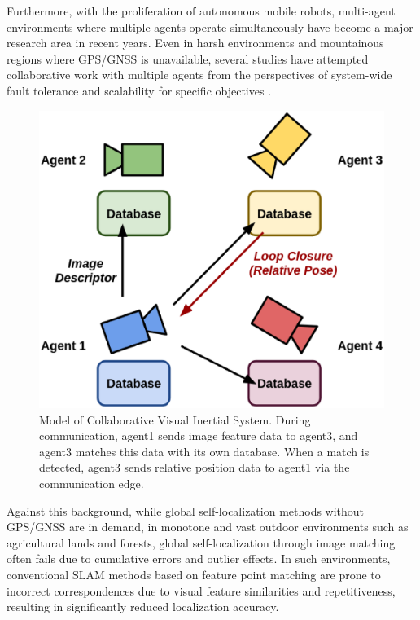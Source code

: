 \documentclass[a4paper,fleqn,10pt,twocolumn]{SICE_ISCS}
\begin{document}
Furthermore, with the proliferation of autonomous mobile robots, multi-agent environments where multiple agents operate simultaneously have become a major research area in recent years. Even in harsh environments and mountainous regions where GPS/GNSS is unavailable, several studies have attempted collaborative work with multiple agents from the perspectives of system-wide fault tolerance and scalability for specific objectives \cite{Chen2021}\cite{Zhou2018}.
\begin{figure}[H]
	\begin{center}
		\includegraphics[width=\linewidth]{Fig/simple_model.eps}
		\caption{Model of Collaborative Visual Inertial System. During communication, agent1 sends image feature data to agent3, and agent3 matches this data with its own database. When a match is detected, agent3 sends relative position data to agent1 via the communication edge.}
		\label{fig:simple_model}
	\end{center}
	\vspace{-2mm}
\end{figure}
Against this background, while global self-localization methods without GPS/GNSS are in demand, in monotone and vast outdoor environments such as agricultural lands and forests, global self-localization through image matching often fails due to cumulative errors and outlier effects. In such environments, conventional SLAM methods based on feature point matching are prone to incorrect correspondences due to visual feature similarities and repetitiveness, resulting in significantly reduced localization accuracy.
\end{document}
